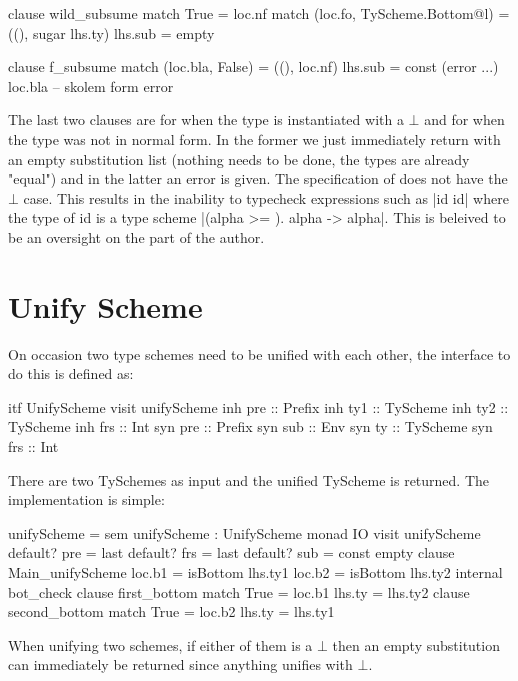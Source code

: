 \begin{code}
clause wild_subsume
  match True                        = loc.nf
  match (loc.fo, TyScheme.Bottom@l) = ((), sugar lhs.ty)
  lhs.sub = empty
  
clause f_subsume
  match (loc.bla, False) = ((), loc.nf)
  lhs.sub = const (error ...) loc.bla -- skolem form error
\end{code}
The last two clauses are for when the type is instantiated with a $\bot$ and for when the type was not in normal form. In the former we just immediately return with an empty substitution list (nothing needs to be done, the types are already "equal") and in the latter an error is given. The specification of \cite{HML} does not have the $\bot$ case. This results in the inability to typecheck expressions such as |id id| where the type of id is a type scheme |(alpha >= \bot). alpha -> alpha|. This is beleived to be an oversight on the part of the author.

\section{Unify Scheme} 
On occasion two type schemes need to be unified with each other, the interface to do this is defined as:

\begin{code}
itf UnifyScheme
  visit unifyScheme
    inh pre  :: Prefix
    inh ty1  :: TyScheme
    inh ty2  :: TyScheme
    inh frs  :: Int
    syn pre  :: Prefix
    syn sub  :: Env
    syn ty   :: TyScheme
    syn frs  :: Int 
\end{code}

There are two TySchemes as input and the unified TyScheme is returned. The implementation is simple:

\begin{code}
unifyScheme = sem unifyScheme : UnifyScheme monad IO
                visit unifyScheme
                  default? pre = last
                  default? frs = last
                  default? sub = const empty
                  clause Main_unifyScheme
                      loc.b1  = isBottom lhs.ty1
                      loc.b2  = isBottom lhs.ty2
                      internal bot_check
                        clause first_bottom
                            match True  = loc.b1
                            lhs.ty      = lhs.ty2
                        clause second_bottom
                            match True  = loc.b2
                            lhs.ty      = lhs.ty1
\end{code}
When unifying two schemes, if either of them is a $\bot$ then an empty substitution can immediately be returned since anything unifies with $\bot$. 


